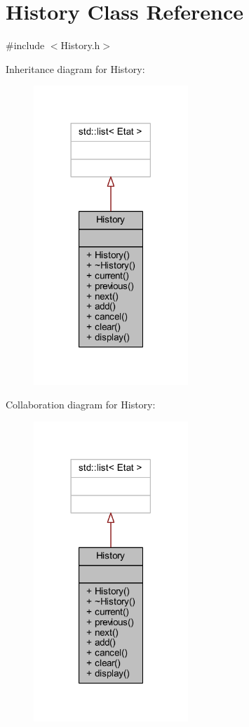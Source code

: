 \hypertarget{class_history}{}\section{History Class Reference}
\label{class_history}


{\ttfamily \#include $<$History.\+h$>$}



Inheritance diagram for History\+:
\nopagebreak
\begin{figure}[H]
\begin{center}
\leavevmode
\includegraphics[width=165pt]{class_history__inherit__graph}
\end{center}
\end{figure}


Collaboration diagram for History\+:
\nopagebreak
\begin{figure}[H]
\begin{center}
\leavevmode
\includegraphics[width=165pt]{class_history__coll__graph}
\end{center}
\end{figure}
